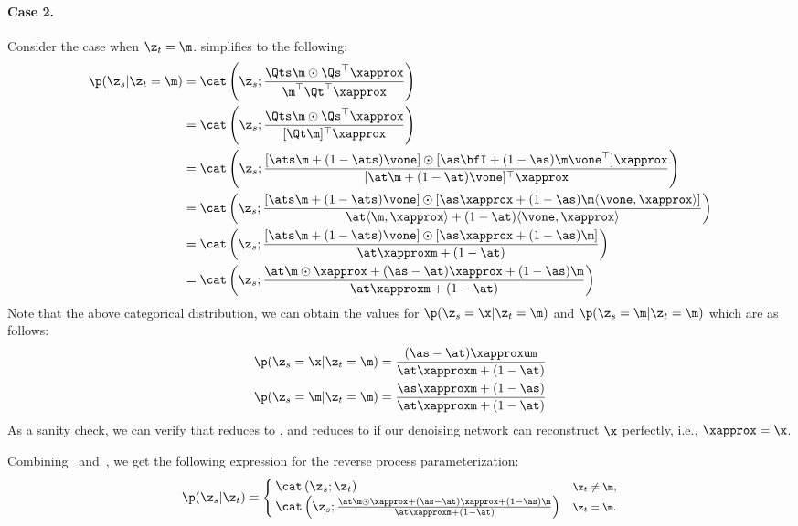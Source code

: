 \documentclass{article} %
\begin{document}
{\begin{appendices}
\paragraph{Case 2.} Consider the case when $\z_t = \m$.  simplifies to the following:
\begin{align}\label{eqn:p_st_discrete_old}
    \p(\z_s | \z_t = \m)
    & = \cat \left(\z_s; \frac{\Qts \m \odot \Qs^\top \xapprox}{
            \m^\top \Qt^\top \xapprox} \right) \nonumber \\
    & = \cat \left(\z_s; \frac{\Qts \m \odot \Qs^\top \xapprox}{
            [\Qt \m] ^ \top \xapprox} \right) \nonumber \\
    & = \cat \left(\z_s; 
        \frac{[\ats \m + (1 - \ats)\vone] \odot [\as \bfI+ (1 - \as) \m \vone^\top] \xapprox}{
            [\at \m + (1 - \at)\vone] ^ \top \xapprox} \right) \nonumber \\
    & = \cat \left(\z_s; 
        \frac{[\ats \m + (1 - \ats)\vone] \odot [\as \xapprox + (1 - \as) \m  \langle \vone, \xapprox \rangle] }{
            \at \langle \m, \xapprox \rangle + (1 - \at) \langle \vone, \xapprox \rangle} \right) \nonumber \\
    & = \cat \left(\z_s; 
        \frac{[\ats \m + (1 - \ats)\vone] \odot [\as \xapprox + (1 - \as) \m ] }{\at \xapproxm + (1 - \at)} \right) \nonumber \\
    & = \cat \left(\z_s; 
        \frac{\at \m \odot \xapprox + (\as - \at)\xapprox + (1 - \as) \m }{\at \xapproxm + (1 - \at)} \right)
\end{align}
Note that the above categorical distribution, we can obtain the values for $\p(\z_s = \x| \z_t = \m)$ and $\p(\z_s = \m| \z_t = \m)$ which are as follows:
\begin{align}
    & \p(\z_s = \x| \z_t = \m) = \frac{
        (\as - \at) \xapproxum}{\at \xapproxm + (1 - \at)}\label{subsec:eqn:d3pm_p_st_unmasked_old} \\
    & \p(\z_s = \m| \z_t = \m) = \frac{
        \as \xapproxm + (1 - \as)}{\at \xapproxm + (1 - \at)} \label{eqn:d3pm_p_st_masked_old}
\end{align}
As a sanity check, we can verify that  reduces to , and  reduces to  if our denoising network can reconstruct $\x$ perfectly, i.e., $\xapprox = \x$.

Combining~ and~, we get the following expression for the reverse process parameterization:
\begin{align}\label{eqn:d3pm_approximate_posterior}
    \p(\z_s| \z_t) =
    \begin{cases}
    \cat \left(\z_s; \z_t \right) & \text{\footnotesize $\z_t \neq \m$}, \\
    \cat \left(\z_s; 
        \frac{\at \m \odot \xapprox + (\as - \at)\xapprox + (1 - \as) \m }{\at \xapproxm + (1 - \at)} \right) & \text{\footnotesize $\z_t = \m$.}
    \end{cases}
\end{align}


\end{appendices}}
\end{document}
